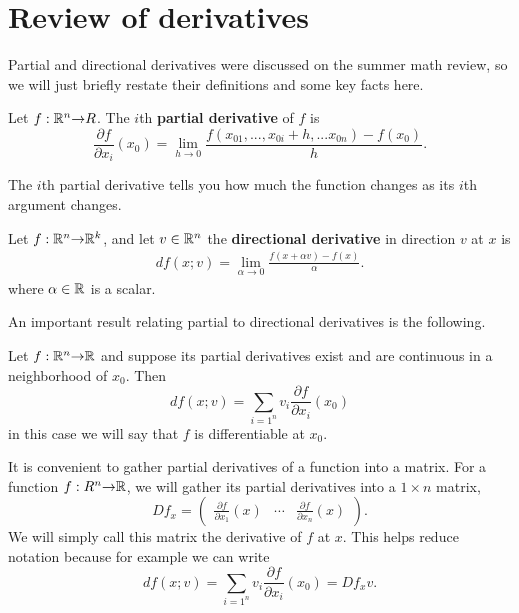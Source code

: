 \section{Review of derivatives \label{sec:derivatives}}
Partial and directional derivatives were discussed on the summer math
review, so we will just briefly restate their definitions and some key
facts here.
\begin{definition}
  Let $f:\mathbb{R}^n {\rightarrow} R$. The $i$th \textbf{partial derivative} of $f$
  is
  \[ \frac{\partial f}{\partial x_i} (x_0) = \lim_{h \to 0}
  \frac{f(x_{01},...,x_{0i}+h, ... x_{0n}) - f(x_0) }{h}. \]
\end{definition}
The $i$th partial derivative tells you how much the function changes
as its $i$th argument changes. 
\begin{definition}
  Let $f: \mathbb{R}^n {\rightarrow} \mathbb{R}^k$, and let $v \in \mathbb{R}^n$ the \textbf{directional
    derivative} in direction $v$ at $x$ is
  \begin{align*}
    df(x;v) = \lim_{\alpha \to 0} \frac{f(x + \alpha v) - f(x)}{\alpha}.
  \end{align*}  
  where $\alpha \in \mathbb{R}$ is a scalar.
\end{definition}
An important result relating partial to directional derivatives is the
following.
\begin{theorem}\label{thm:pddiff}
  Let $f:\mathbb{R}^n {\rightarrow} \mathbb{R}$ and suppose its partial derivatives exist and
  are continuous in a neighborhood of $x_0$. Then
  \[ df(x;v) = \sum_{i=1^n} v_i \frac{\partial f}{\partial x_i}
  (x_0) \]
  in this case we will say that $f$ is differentiable at $x_0$.
\end{theorem}

It is convenient to gather partial derivatives of a function into a
matrix. For a function $f: R^n {\rightarrow} \mathbb{R}$, we will gather its partial
derivatives into a $1 \times n$ matrix, 
\[ Df_x = \begin{pmatrix} \frac{\partial f}{\partial x_1}(x) & \cdots
  & \frac{\partial f}{\partial x_n}(x)
\end{pmatrix}. \]
We will simply call this matrix the derivative of $f$ at $x$. This
helps reduce notation because for example we can write
\[ df(x;v) = \sum_{i=1^n} v_i \frac{\partial f}{\partial x_i}
(x_0) = Df_x v. \]

